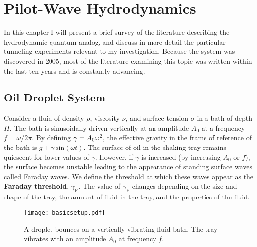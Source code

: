 \chapter{Pilot-Wave Hydrodynamics}
\label{Ch1}

In this chapter I will present a brief survey of the literature describing the hydrodynamic quantum analog, and discuss in more detail the particular tunneling experiments relevant to my investigation. Because the system was discovered in 2005, most of the literature examining this topic was written within the last ten years and is constantly advancing.


\section{Oil Droplet System}
	    \label{parameters}
	       Consider a fluid of density $\rho$, viscosity $\nu$, and surface tension $\sigma$ in a bath of depth $H$. The bath is sinusoidally driven vertically at an amplitude $A_0$ at a frequency $f=\omega/{2\pi}$. By defining $\mathnormal{\gamma}=A_0\omega^2$, the effective gravity in the frame of reference of the bath is $g+\gamma~\mathrm{sin}(\omega t)$. The surface of oil in the shaking tray remains quiescent for lower values of $\gamma$. However, if  $\gamma$ is increased (by increasing $A_0$ or $f$), the surface becomes unstable leading to the appearance of standing surface waves called Faraday waves. We define the threshold at which these waves appear as the \textbf{Faraday threshold}, $\gamma_\mathrm{F}$. The value of $\gamma_\mathrm{F}$ changes depending on the size and shape of the tray, the amount of fluid in the tray, and the properties of the fluid. 
	       
	   \begin{figure}[h]
	       \centering
	    \texttt{[image: basicsetup.pdf]}
	     \caption{A droplet bounces on a vertically vibrating fluid bath. The tray vibrates with an amplitude $A_0$ at frequency $f$.}
	 \label{basic}
	\end{figure}
	       
